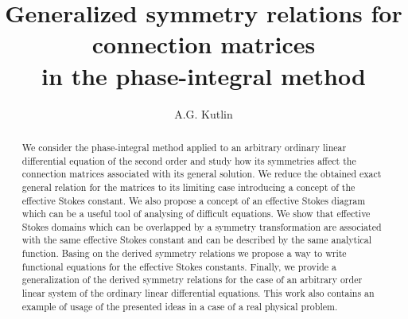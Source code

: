 \documentclass[atmp]{ipart_v1}
\begin{document}
\title[Symmetry relations for connection matrices]
{Generalized symmetry relations for connection matrices \\ in the phase-integral method}
\author[A.G. Kutlin]{A.G. Kutlin}

\begin{abstract}
We consider the phase-integral method applied to
an arbitrary ordinary linear differential equation of the second order and study 
how its symmetries affect the connection matrices associated with its general solution.
We reduce the obtained exact general relation for the matrices to its limiting case introducing
a concept of the effective Stokes constant. We also propose a concept of an effective Stokes 
diagram which can be a useful tool of analysing of difficult equations. We show that effective 
Stokes domains which can be overlapped by a symmetry transformation are associated with the same 
effective Stokes constant and can be described by the same analytical function. Basing on
the derived symmetry relations we propose a way to write functional equations for 
the effective Stokes constants. Finally, we provide a generalization of the derived symmetry 
relations for the case of an arbitrary order linear system of the ordinary linear differential equations. 
This work also contains an example of usage of the presented ideas in a case of a real physical problem.
\end{abstract}

\maketitle
\end{document}
